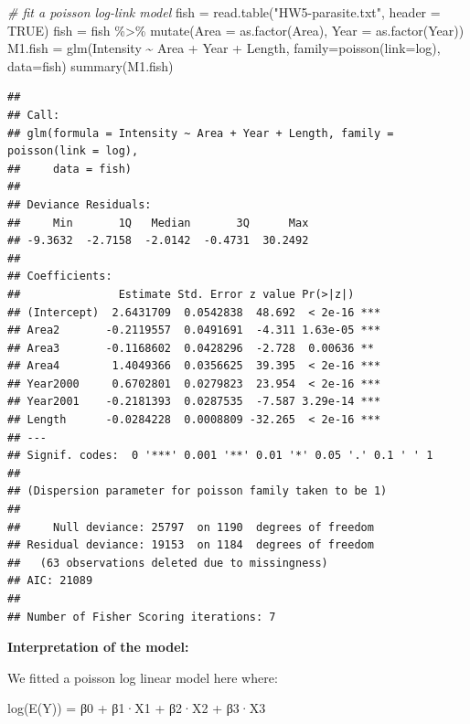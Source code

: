 \documentclass[
]{article}
\newenvironment{Shaded}{\begin{snugshade}}{\end{snugshade}}
\newcommand{\AttributeTok}[1]{\textcolor[rgb]{0.77,0.63,0.00}{#1}}
\newcommand{\CommentTok}[1]{\textcolor[rgb]{0.56,0.35,0.01}{\textit{#1}}}
\newcommand{\ConstantTok}[1]{\textcolor[rgb]{0.00,0.00,0.00}{#1}}
\newcommand{\FunctionTok}[1]{\textcolor[rgb]{0.00,0.00,0.00}{#1}}
\newcommand{\NormalTok}[1]{#1}
\newcommand{\OtherTok}[1]{\textcolor[rgb]{0.56,0.35,0.01}{#1}}
\newcommand{\SpecialCharTok}[1]{\textcolor[rgb]{0.00,0.00,0.00}{#1}}
\newcommand{\StringTok}[1]{\textcolor[rgb]{0.31,0.60,0.02}{#1}}
\begin{document}
\begin{Shaded}
\begin{Highlighting}[]
\CommentTok{\# fit a poisson log{-}link model}
\NormalTok{fish }\OtherTok{=} \FunctionTok{read.table}\NormalTok{(}\StringTok{"HW5{-}parasite.txt"}\NormalTok{, }\AttributeTok{header =} \ConstantTok{TRUE}\NormalTok{)}
\NormalTok{fish }\OtherTok{=} 
\NormalTok{  fish }\SpecialCharTok{\%\textgreater{}\%} 
  \FunctionTok{mutate}\NormalTok{(}\AttributeTok{Area =} \FunctionTok{as.factor}\NormalTok{(Area),}
         \AttributeTok{Year =} \FunctionTok{as.factor}\NormalTok{(Year)) }
\NormalTok{M1.fish }\OtherTok{=} \FunctionTok{glm}\NormalTok{(Intensity }\SpecialCharTok{\textasciitilde{}}\NormalTok{ Area }\SpecialCharTok{+}\NormalTok{ Year }\SpecialCharTok{+}\NormalTok{ Length, }\AttributeTok{family=}\FunctionTok{poisson}\NormalTok{(}\AttributeTok{link=}\NormalTok{log), }\AttributeTok{data=}\NormalTok{fish)}
\FunctionTok{summary}\NormalTok{(M1.fish)}
\end{Highlighting}
\end{Shaded}

\begin{verbatim}
## 
## Call:
## glm(formula = Intensity ~ Area + Year + Length, family = poisson(link = log), 
##     data = fish)
## 
## Deviance Residuals: 
##     Min       1Q   Median       3Q      Max  
## -9.3632  -2.7158  -2.0142  -0.4731  30.2492  
## 
## Coefficients:
##               Estimate Std. Error z value Pr(>|z|)    
## (Intercept)  2.6431709  0.0542838  48.692  < 2e-16 ***
## Area2       -0.2119557  0.0491691  -4.311 1.63e-05 ***
## Area3       -0.1168602  0.0428296  -2.728  0.00636 ** 
## Area4        1.4049366  0.0356625  39.395  < 2e-16 ***
## Year2000     0.6702801  0.0279823  23.954  < 2e-16 ***
## Year2001    -0.2181393  0.0287535  -7.587 3.29e-14 ***
## Length      -0.0284228  0.0008809 -32.265  < 2e-16 ***
## ---
## Signif. codes:  0 '***' 0.001 '**' 0.01 '*' 0.05 '.' 0.1 ' ' 1
## 
## (Dispersion parameter for poisson family taken to be 1)
## 
##     Null deviance: 25797  on 1190  degrees of freedom
## Residual deviance: 19153  on 1184  degrees of freedom
##   (63 observations deleted due to missingness)
## AIC: 21089
## 
## Number of Fisher Scoring iterations: 7
\end{verbatim}

\textbf{Interpretation of the model:}

We fitted a poisson log linear model here where:

log(E(Y)) = β0 + β1·X1 + β2·X2 + β3·X3
\end{document}
